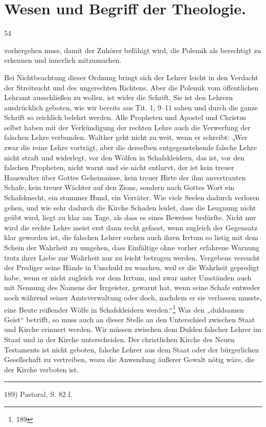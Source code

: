 \section*{Wesen und Begriff der Theologie.}
\hfill 54
\vspace{1em}

vorhergehen muss, damit der Zuhörer befähigt wird, die Polemik als berechtigt zu erkennen und innerlich mitzumachen.

Bei Nichtbeachtung dieser Ordnung bringt sich der Lehrer leicht in den Verdacht der Streitsucht und des ungerechten Richtens. Aber die Polemik vom öffentlichen Lehramt ausschließen zu wollen, ist wider die Schrift. Sie ist den Lehrern ausdrücklich geboten, wie wir bereits aus Tit. 1, 9--11 sahen und durch die ganze Schrift so reichlich belehrt werden. Alle Propheten und Apostel und Christus selbst haben mit der Verkündigung der rechten Lehre auch die Verwerfung der falschen Lehre verbunden. Walther geht nicht zu weit, wenn er schreibt: „Wer zwar die reine Lehre vorträgt, aber die derselben entgegenstehende falsche Lehre nicht straft und widerlegt, vor den Wölfen in Schafskleidern, das ist, vor den falschen Propheten, nicht warnt und sie nicht entlarvt, der ist kein treuer Hauswalter über Gottes Geheimnisse, kein treuer Hirte der ihm anvertrauten Schafe, kein treuer Wächter auf den Zions, sondern nach Gottes Wort ein Schafsknecht, ein stummer Hund, ein Verräter. Wie viele Seelen dadurch verloren gehen, und wie sehr dadurch die Kirche Schaden leidet, dass die Leugnung nicht geübt wird, liegt zu klar am Tage, als dass es eines Beweises bedürfte. Nicht nur wird die rechte Lehre meist erst dann recht gefasst, wenn zugleich der Gegensatz klar geworden ist, die falschen Lehrer suchen auch ihren Irrtum so listig mit dem Schein der Wahrheit zu umgehen, dass Einfältige ohne vorher erfahrene Warnung trotz ihrer Liebe zur Wahrheit nur zu leicht betrogen werden. Vergebens versucht der Prediger seine Hände in Unschuld zu waschen, weil er die Wahrheit gepredigt habe, wenn er nicht zugleich vor dem Irrtum, und zwar unter Umständen auch mit Nennung des Namens der Irrgeister, gewarnt hat, wenn seine Schafe entweder noch während seiner Amtsverwaltung oder doch, nachdem er sie verlassen musste, eine Beute reißender Wölfe in Schafskleidern werden.“\footnote{189} Was den „duldsamen Geist“ betrifft, so muss auch an dieser Stelle an den Unterschied zwischen Staat und Kirche erinnert werden. Wir müssen zwischen dem Dulden falscher Lehrer im Staat und in der Kirche unterscheiden. Der christlichen Kirche des Neuen Testaments ist nicht geboten, falsche Lehrer aus dem Staat oder der bürgerlichen Gesellschaft zu vertreiben, wozu die Anwendung äußerer Gewalt nötig wäre, die der Kirche verboten ist.

\vspace{1em}
\hrule
\vspace{0.5em}
\footnotesize
189) Pastoral, S. 82 f.